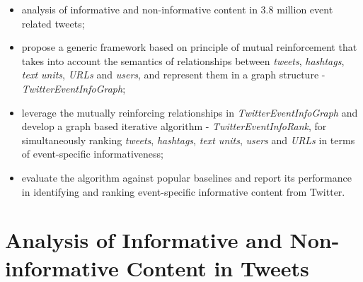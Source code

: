 \begin{itemize}
\item analysis of informative and non-informative content in 3.8 million event related tweets;
\item propose a generic framework based on principle of mutual reinforcement that takes into account the semantics of relationships between \textit{tweets}, \textit{hashtags}, \textit{text units}, \textit{URLs} and \textit{users}, and represent them in a graph structure - \textit{TwitterEventInfoGraph};
\item leverage the mutually reinforcing relationships in \textit{TwitterEventInfoGraph} and develop a graph based iterative algorithm - \textit{TwitterEventInfoRank}, for simultaneously ranking \textit{tweets}, \textit{hashtags}, \textit{text units}, \textit{users} and \textit{URLs} in terms of event-specific informativeness;
\item evaluate the algorithm against popular baselines and report its performance in identifying and ranking event-specific informative content from Twitter.

\end{itemize}


\section{Analysis of Informative and Non-informative Content in Tweets}

